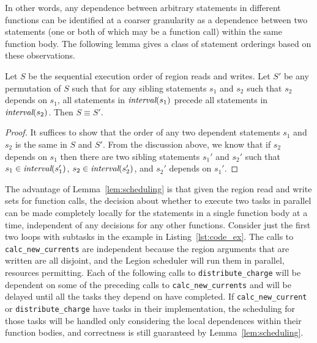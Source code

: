 In other words, any dependence between arbitrary statements
in different functions can be identified at a coarser granularity as a
dependence between two statements (one or both of which may be a function call) within the same function body.  
The following lemma gives a class of statement orderings based on these observations.
\begin{lemma}
\rm
\label{lem:scheduling}
Let $S$ be the sequential execution order of region reads and writes.  Let $S'$ be any permutation of $S$ such that
for any sibling statements $s_1$ and $s_2$ such that $s_2$ depends on $s_1$, all statements in $\mbox{\em interval}(s_1)$ precede
all statements in $\mbox{\em interval}(s_2)$.  Then $S \equiv S'$.
\end{lemma}
\begin{proof}
It suffices to show that the order of any two dependent statements $s_1$ and $s_2$ is the same in $S$ and $S'$.
From the discussion above, we know that if $s_2$ depends on $s_1$ then there are two sibling statements $s_1'$ and $s_2'$
such that $s_1 \in \mbox{\em interval}(s_1')$, $s_2 \in \mbox{\em interval}(s_2')$, and $s_2'$ depends
on $s_1'$.
\end{proof}
The advantage of Lemma~\ref{lem:scheduling} is that given
the region read and write sets for function calls, the decision about
whether to execute two tasks in parallel can be made completely locally for the statements in a
single function body at a time, independent of any decisions for
any other functions.  
Consider just the first two loops with subtasks in the example in Listing~\ref{lst:code_ex}.
The calls to {\tt calc\_new\_currents} are independent because the region arguments that are written
are all disjoint, and the Legion scheduler will run them in parallel, resources permitting.  Each of the following calls to
{\tt distribute\_charge} will be dependent on some of the preceding calls to {\tt calc\_new\_currents} and will be delayed until
all the tasks they depend on have completed.  If {\tt calc\_new\_current} or {\tt distribute\_charge} have tasks in their implementation, the scheduling for those tasks will be handled only considering the local dependences within their function bodies, and
correctness is still guaranteed by Lemma~\ref{lem:scheduling}.






   













